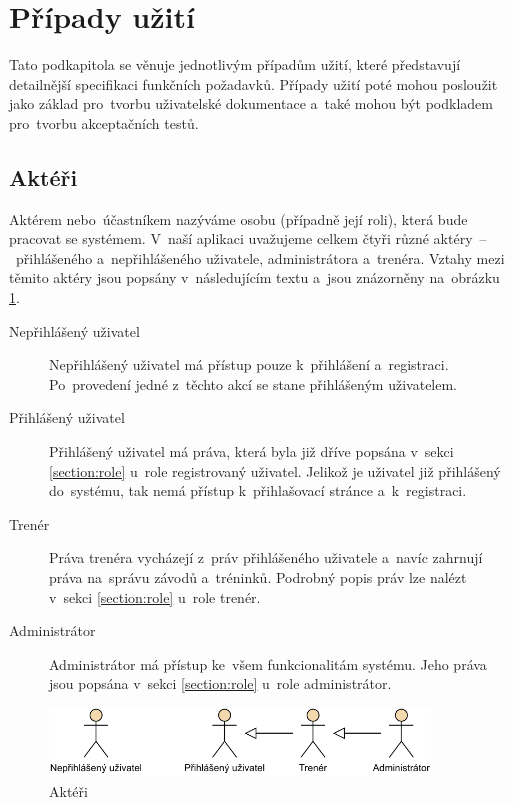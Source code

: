 \section{Případy užití}
Tato podkapitola se věnuje jednotlivým případům užití, které představují detailnější specifikaci funkčních požadavků. Případy užití poté mohou posloužit jako základ pro~tvorbu uživatelské dokumentace a~také mohou být podkladem pro~tvorbu akceptačních testů. \cite{usecases}

\subsection{Aktéři}
Aktérem nebo~účastníkem nazýváme osobu (případně její roli), která bude pracovat se systémem. V~naší aplikaci uvažujeme celkem čtyři různé aktéry~–~přihlášeného a~nepřihlášeného uživatele, administrátora a~trenéra. Vztahy mezi těmito aktéry jsou popsány v~následujícím textu a~jsou znázorněny na~obrázku \ref{figure:actors}.
\begin{description}
	\item[Nepřihlášený uživatel]\hfill\newline
	Nepřihlášený uživatel má přístup pouze k~přihlášení a~registraci. Po~provedení jedné z~těchto akcí se stane přihlášeným uživatelem.
	\item[Přihlášený uživatel]\hfill\newline
	Přihlášený uživatel má práva, která byla již dříve popsána v~sekci \ref{section:role} u~role registrovaný uživatel. Jelikož je uživatel již přihlášený do~systému, tak nemá přístup k~přihlašovací stránce a~k~registraci.
	\item[Trenér]\hfill\newline
	Práva trenéra vycházejí z~práv přihlášeného uživatele a~navíc zahrnují práva na~správu závodů a~tréninků. Podrobný popis práv lze nalézt v~sekci \ref{section:role} u~role trenér.
	\item[Administrátor]\hfill\newline
	Administrátor má přístup ke~všem funkcionalitám systému. Jeho práva jsou popsána v~sekci \ref{section:role} u~role administrátor.
\end{description}

\begin{figure}[h]
	\caption{Aktéři}
	\label{figure:actors}
	\centering
	\includegraphics[width=0.9\textwidth]{images/actors.pdf}
\end{figure}


